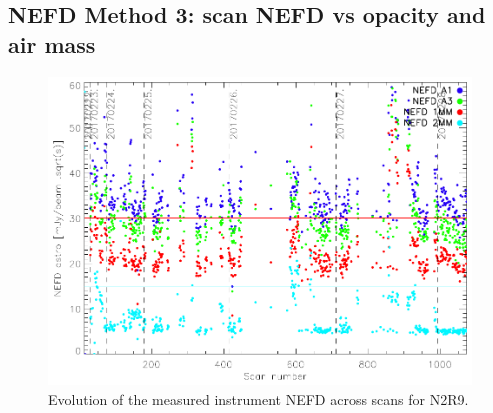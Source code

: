 \subsection{NEFD Method 3: scan NEFD vs opacity and air mass}
\begin{figure}
\begin{center}
\includegraphics[clip, angle=0, scale =0.8]{Figures/NEFDIndScans/nefd_evol_run22.pdf}
\caption{Evolution of the measured instrument NEFD across scans for N2R9.}
\label{fig:nefdvsscans}
\end{center}
\end{figure}

